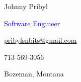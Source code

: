 \documentclass[12pt]{resume}
\begin{document}
    \noindent\begin{minipage}[t]{0.73\textwidth}
        \vspace{-4mm}
        {\par \Huge Johnny Pribyl}
        {\par \Large \textcolor{blue}{Software Engineer}}
    \end{minipage}
    \begin{minipage}[t]{0.25\textwidth}
        \begin{flushright}
            {\par \textcolor{black}{\href{mailto:pribylsnbits@gmail.com}{pribylsnbits@gmail.com}}}
            {\par 713-569-3056}
            {\par Bozeman, Montana}
        \end{flushright}
    \end{minipage}
    \begin{minipage}[t]{0.03\textwidth}
        \begin{center}
            {\par \faEnvelope[regular]} 
            {\par \faMobile*} 
            {\par \faMapMarker*} 
        \end{center}
        \vspace{.01mm}
    \end{minipage}
    \makebox[\linewidth]{\rule{\paperwidth}{0.2pt}}
\end{document}
